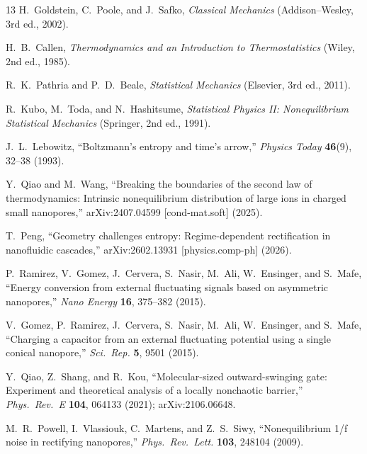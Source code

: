 \documentclass[11pt,a4paper]{article}
\begin{document}
\begin{thebibliography}{13}
H.~Goldstein, C.~Poole, and J.~Safko,
\textit{Classical Mechanics} (Addison--Wesley, 3rd ed., 2002).

H.~B.~Callen,
\textit{Thermodynamics and an Introduction to Thermostatistics}
(Wiley, 2nd ed., 1985).

R.~K.~Pathria and P.~D.~Beale,
\textit{Statistical Mechanics} (Elsevier, 3rd ed., 2011).

R.~Kubo, M.~Toda, and N.~Hashitsume,
\textit{Statistical Physics II: Nonequilibrium Statistical Mechanics}
(Springer, 2nd ed., 1991).

J.~L.~Lebowitz,
``Boltzmann's entropy and time's arrow,''
\textit{Physics Today} \textbf{46}(9), 32--38 (1993).

Y.~Qiao and M.~Wang,
``Breaking the boundaries of the second law of thermodynamics: Intrinsic nonequilibrium
distribution of large ions in charged small nanopores,''
arXiv:2407.04599 [cond-mat.soft] (2025).

T.~Peng,
``Geometry challenges entropy: Regime-dependent rectification in nanofluidic cascades,''
arXiv:2602.13931 [physics.comp-ph] (2026).

P.~Ramirez, V.~Gomez, J.~Cervera, S.~Nasir, M.~Ali, W.~Ensinger, and S.~Mafe,
``Energy conversion from external fluctuating signals based on asymmetric nanopores,''
\textit{Nano Energy} \textbf{16}, 375--382 (2015).

V.~Gomez, P.~Ramirez, J.~Cervera, S.~Nasir, M.~Ali, W.~Ensinger, and S.~Mafe,
``Charging a capacitor from an external fluctuating potential using a single conical nanopore,''
\textit{Sci.\ Rep.} \textbf{5}, 9501 (2015).

Y.~Qiao, Z.~Shang, and R.~Kou,
``Molecular-sized outward-swinging gate: Experiment and theoretical analysis of a locally nonchaotic barrier,''
\textit{Phys.\ Rev.\ E} \textbf{104}, 064133 (2021);
arXiv:2106.06648.

M.~R.~Powell, I.~Vlassiouk, C.~Martens, and Z.~S.~Siwy,
``Nonequilibrium 1/f noise in rectifying nanopores,''
\textit{Phys.\ Rev.\ Lett.} \textbf{103}, 248104 (2009).
\end{thebibliography}
\end{document}
